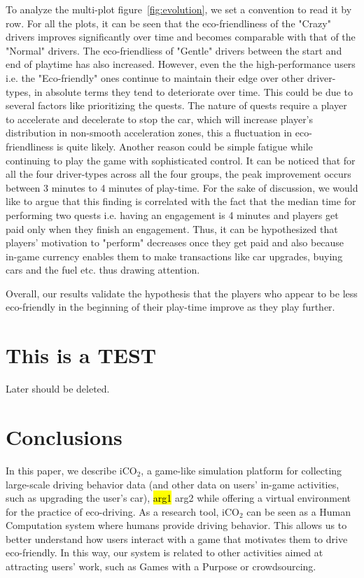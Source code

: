 \documentclass[preprint,authoryear,12pt]{elsarticle}
\newcommand{\hlc}[2][yellow]{ {\sethlcolor{#1} \hl{#2}} }
\begin{document}
To analyze the multi-plot figure~\ref{fig:evolution}, we set a convention to read it by row. For all the plots, it can be seen that the eco-friendliness of the "Crazy" drivers improves significantly over time and becomes comparable with that of the "Normal" drivers. The eco-friendliess of "Gentle" drivers between the start and end of playtime has also increased. However, even the  the high-performance users i.e. the "Eco-friendly" ones continue to maintain their edge over other driver-types, in absolute terms they tend to deteriorate over time. This could be due to several factors like prioritizing the quests. The nature of quests require a player to accelerate and decelerate to stop the car, which will increase player's distribution in non-smooth acceleration zones, this a fluctuation in eco-friendliness is quite likely. Another reason could be simple fatigue while continuing to play the game with sophisticated control. It can be noticed that for all the four driver-types across all the four groups, the peak improvement occurs between 3 minutes to 4 minutes of play-time. For the sake of discussion, we would like to argue that this finding is correlated with the fact that the median time for performing two quests i.e. having an engagement is 4 minutes and players get paid only when they finish an engagement. Thus, it can be hypothesized that players' motivation to "perform" decreases once they get paid and also because in-game currency  enables them to make transactions like car upgrades, buying cars and the fuel etc. thus drawing attention. 

Overall, our results validate the hypothesis that the players who appear to be less eco-friendly in the beginning of their play-time improve as they play further. 

\section{This is a TEST}
{
Later should be deleted. }

\section{Conclusions} \label{sec:conclusions}

In this paper, we describe iCO$_2$, a game-like simulation platform for collecting large-scale driving behavior data (and other data on users' in-game activities, such as upgrading the user's car), 
\hlc{arg1}{arg2} while offering a virtual environment for the practice of eco-driving. 
As a research tool, iCO$_2$ can be seen as a Human Computation system where humans provide driving behavior. This allows us to better understand how users interact with a game that motivates them to drive eco-friendly. In this way, our system is related to other activities aimed at attracting users' work, such as Games with a Purpose or crowdsourcing.
\end{document}
